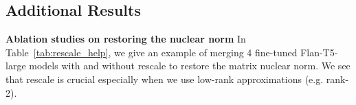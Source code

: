\subsection{Additional Results}

\noindent\textbf{Ablation studies on restoring the nuclear norm}
In Table~\ref{tab:rescale_help}, we give an example of merging 4 fine-tuned Flan-T5-large models with and without rescale to restore the matrix nuclear norm.
We see that rescale is crucial especially when we use low-rank approximations (e.g. rank-2). 
\begin{table}[t]
\centering
{}
\caption{The ablation study of the rescaling step to restore nuclear norms (i.e. Sec.~\ref{subsec:rescale}).}
\label{tab:rescale_help}
\end{table}


